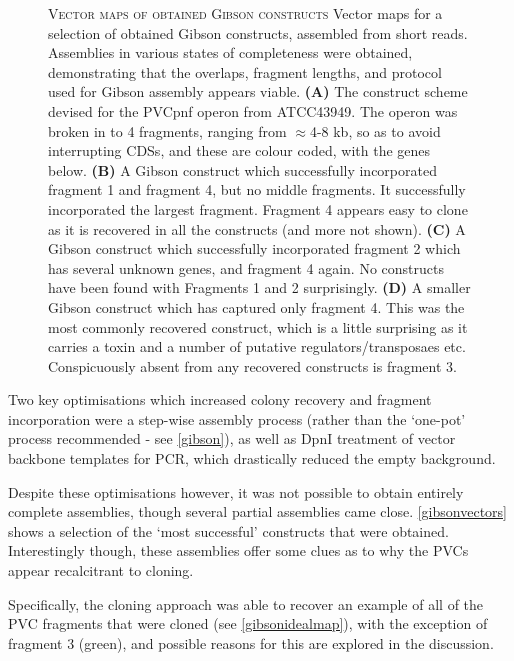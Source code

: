 \begin{figure}[p]
    \captionsetup{singlelinecheck=off, justification=justified, font=footnotesize, aboveskip=10pt}
    \caption[Gibson constructs obtained]{\textsc{\normalsize Vector maps of obtained Gibson constructs} \vspace{0.1cm} \newline Vector maps for a selection of obtained Gibson constructs, assembled from short reads. Assemblies in various states of completeness were obtained, demonstrating that the overlaps, fragment lengths, and protocol used for Gibson assembly appears viable. \textbf{(A)} The construct scheme devised for the PVCpnf operon from ATCC43949. The operon was broken in to 4 fragments, ranging from $\approx$4-8 kb, so as to avoid interrupting CDSs, and these are colour coded, with the genes below. \textbf{(B)} A Gibson construct which successfully incorporated {\color{red}fragment 1} and {\color{gray}fragment 4}, but no middle fragments. It successfully incorporated the largest fragment. Fragment 4 appears easy to clone as it is recovered in all the constructs (and more not shown). \textbf{(C)} A Gibson construct which successfully incorporated {\color{orange}fragment 2} which has several unknown genes, and {\color{gray}fragment 4} again. No constructs have been found with Fragments 1 and 2 surprisingly. \textbf{(D)} A smaller Gibson construct which has captured only {\color{gray}fragment 4}. This was the most commonly recovered construct, which is a little surprising as it carries a toxin and a number of putative regulators/transposaes etc. Conspicuously absent from any recovered constructs is {\color{Green}fragment 3}.}
\label{gibsonvectors}
\end{figure}


Two key optimisations which increased colony recovery and fragment incorporation were a step-wise assembly process (rather than the `one-pot' process recommended - see \vref{gibson}), as well as DpnI treatment of vector backbone templates for PCR, which drastically reduced the empty background.


Despite these optimisations however, it was not possible to obtain entirely complete assemblies, though several partial assemblies came close. \vref{gibsonvectors} shows a selection of the `most successful' constructs that were obtained. Interestingly though, these assemblies offer some clues as to why the PVCs appear recalcitrant to cloning.

Specifically, the cloning approach was able to recover an example of all of the PVC fragments that were cloned (see \vref{gibsonidealmap}), with the exception of fragment 3 (green), and possible reasons for this are explored in the discussion.


